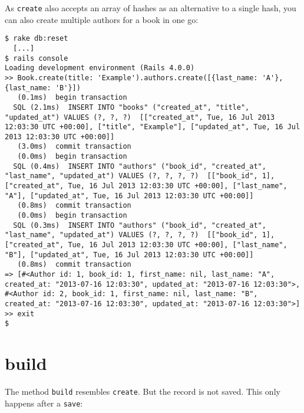 \documentclass[a4paper]{book}
\newcommand{\chap}[1]{\newpage\thispagestyle{empty}\chapter{#1}\label{chap:\thechapter}}
\begin{document}
As \texttt{create} also accepts an array of hashes as an alternative to a single hash, you can also create multiple authors for a book in one go:

\begin{shaded}\begin{verbatim}
$ rake db:reset
  [...]
$ rails console
Loading development environment (Rails 4.0.0)
>> Book.create(title: 'Example').authors.create([{last_name: 'A'}, {last_name: 'B'}])
   (0.1ms)  begin transaction
  SQL (2.1ms)  INSERT INTO "books" ("created_at", "title", "updated_at") VALUES (?, ?, ?)  [["created_at", Tue, 16 Jul 2013 12:03:30 UTC +00:00], ["title", "Example"], ["updated_at", Tue, 16 Jul 2013 12:03:30 UTC +00:00]]
   (3.0ms)  commit transaction
   (0.0ms)  begin transaction
  SQL (0.4ms)  INSERT INTO "authors" ("book_id", "created_at", "last_name", "updated_at") VALUES (?, ?, ?, ?)  [["book_id", 1], ["created_at", Tue, 16 Jul 2013 12:03:30 UTC +00:00], ["last_name", "A"], ["updated_at", Tue, 16 Jul 2013 12:03:30 UTC +00:00]]
   (0.8ms)  commit transaction
   (0.0ms)  begin transaction
  SQL (0.3ms)  INSERT INTO "authors" ("book_id", "created_at", "last_name", "updated_at") VALUES (?, ?, ?, ?)  [["book_id", 1], ["created_at", Tue, 16 Jul 2013 12:03:30 UTC +00:00], ["last_name", "B"], ["updated_at", Tue, 16 Jul 2013 12:03:30 UTC +00:00]]
   (0.8ms)  commit transaction
=> [#<Author id: 1, book_id: 1, first_name: nil, last_name: "A", created_at: "2013-07-16 12:03:30", updated_at: "2013-07-16 12:03:30">, #<Author id: 2, book_id: 1, first_name: nil, last_name: "B", created_at: "2013-07-16 12:03:30", updated_at: "2013-07-16 12:03:30">]
>> exit
$
\end{verbatim}\end{shaded}

\chap{build}\label{build}

The method \texttt{build} resembles \texttt{create}. But the record is not saved. This only happens after a \texttt{save}:
\end{document}
